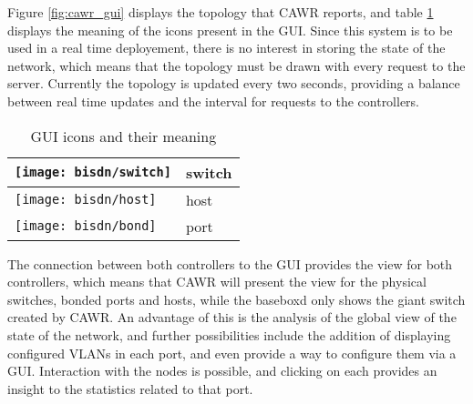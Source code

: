 \par Figure \ref{fig:cawr_gui} displays the topology that CAWR reports, and table \ref{tab:gui-mapping} displays the meaning of the icons present in the GUI. Since 
this system is to be used in a real time deployement, there is no interest in storing the state of the network, which means that the topology must be drawn with 
every request to the server. Currently the topology is updated every two seconds, providing a balance between real time updates and the interval for requests to the
controllers.

\begin{table}[H]
    \centering
    \caption{GUI icons and their meaning}
    \label{tab:gui-mapping}
    \begin{tabular}{l | l}

        \centering
            \texttt{[image: bisdn/switch]}
        
        & switch     & \\ \hline 

            \texttt{[image: bisdn/host]}
        
        & host     & \\ \hline 
        
        \texttt{[image: bisdn/bond]}
        
        & port     & \\
   \end{tabular}
\end{table}

\par The connection between both controllers to the GUI provides the view for both controllers, which means that CAWR will present the view for the physical
switches, bonded ports and hosts, while the baseboxd only shows the giant switch created by CAWR. An advantage of this is the analysis of the global view of the
state of the network, and further possibilities include the addition of displaying configured VLANs in each port, and even provide a way to configure them via a GUI.
Interaction with the nodes is possible, and clicking on each provides an insight to the statistics related to that port.  
